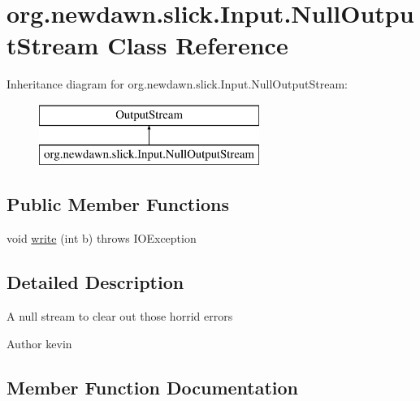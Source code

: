 \hypertarget{classorg_1_1newdawn_1_1slick_1_1_input_1_1_null_output_stream}{}\section{org.\+newdawn.\+slick.\+Input.\+Null\+Output\+Stream Class Reference}
\label{classorg_1_1newdawn_1_1slick_1_1_input_1_1_null_output_stream}
Inheritance diagram for org.\+newdawn.\+slick.\+Input.\+Null\+Output\+Stream\+:\begin{figure}[H]
\begin{center}
\leavevmode
\includegraphics[height=2.000000cm]{classorg_1_1newdawn_1_1slick_1_1_input_1_1_null_output_stream}
\end{center}
\end{figure}
\subsection*{Public Member Functions}
\begin{DoxyCompactItemize}
\item 
void \mbox{\hyperlink{classorg_1_1newdawn_1_1slick_1_1_input_1_1_null_output_stream_a0427a233f0f97bd8ce3afe2427ed0648}{write}} (int b)  throws I\+O\+Exception 
\end{DoxyCompactItemize}


\subsection{Detailed Description}
A null stream to clear out those horrid errors

\begin{DoxyAuthor}{Author}
kevin 
\end{DoxyAuthor}


\subsection{Member Function Documentation}
\mbox{\label{classorg_1_1newdawn_1_1slick_1_1_input_1_1_null_output_stream_a0427a233f0f97bd8ce3afe2427ed0648}} 
